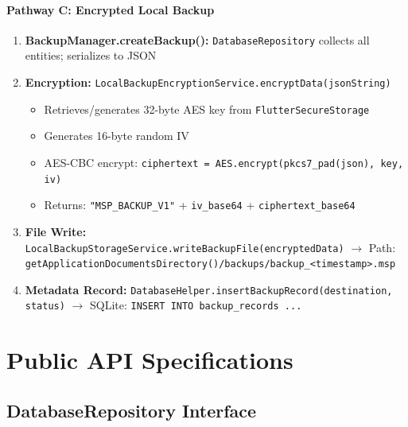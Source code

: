 \documentclass[12pt,a4paper,openany]{report}
\begin{document}
\paragraph{Pathway C: Encrypted Local Backup}

\begin{enumerate}[leftmargin=*]
  \item \textbf{BackupManager.createBackup():} \texttt{DatabaseRepository} collects all entities; serializes to JSON
  \item \textbf{Encryption:} \texttt{LocalBackupEncryptionService.encryptData(jsonString)}
  \begin{itemize}[leftmargin=*]
    \item Retrieves/generates 32-byte AES key from \texttt{FlutterSecureStorage}
    \item Generates 16-byte random IV
    \item AES-CBC encrypt: \texttt{ciphertext = AES.encrypt(pkcs7\_pad(json), key, iv)}
    \item Returns: \texttt{"MSP\_BACKUP\_V1"} + \texttt{iv\_base64} + \texttt{ciphertext\_base64}
  \end{itemize}
  \item \textbf{File Write:} \texttt{LocalBackupStorageService.writeBackupFile(encryptedData)} $\to$ Path: \texttt{getApplicationDocumentsDirectory()/backups/backup\_<timestamp>.msp}
  \item \textbf{Metadata Record:} \texttt{DatabaseHelper.insertBackupRecord(destination, status)} $\to$ SQLite: \texttt{INSERT INTO backup\_records ...}
\end{enumerate}

\section{Public API Specifications}

\subsection{DatabaseRepository Interface}
\end{document}
